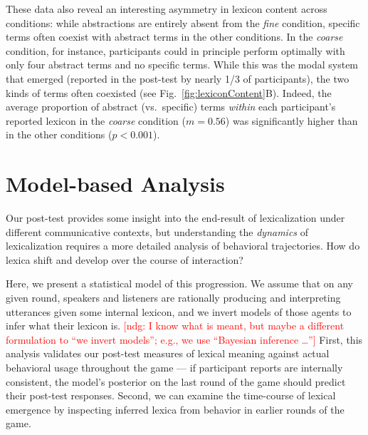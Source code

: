 \documentclass[10pt,letterpaper]{article}
\newcommand{\ndg}[1]{\textcolor{Green}{[ndg: #1]}}
\newcommand{\mf}[1]{\textcolor{Red}{[ndg: #1]}}
\begin{document}
These data also reveal an interesting asymmetry in lexicon content across conditions: while abstractions are entirely absent from the \emph{fine} condition, specific terms often coexist with abstract terms in the other conditions. In the \emph{coarse} condition, for instance, participants could in principle perform optimally with only four abstract terms and no specific terms. While this was the modal system that emerged (reported in the post-test by nearly 1/3 of participants), the two kinds of terms often coexisted (see Fig.\ \ref{fig:lexiconContent}B). Indeed, the average proportion of abstract (vs.\ specific) terms \emph{within} each participant's reported lexicon in the \emph{coarse} condition ($m = 0.56$) was significantly higher than in the other conditions ($p < 0.001$).

\section{Model-based Analysis}

Our post-test provides some insight into the end-result of lexicalization under different communicative contexts, but understanding the \emph{dynamics} of lexicalization requires a more detailed analysis of behavioral trajectories. How do lexica shift and develop over the course of interaction? 

Here, we present a statistical model of this progression. We assume that on any given round, speakers and listeners are rationally producing and interpreting utterances given some internal lexicon, and we invert models of those agents to infer what their lexicon is. \mf{I know what is meant, but maybe a different formulation to ``we invert models''; e.g., we use ``Bayesian inference \dots''} First, this analysis validates our post-test measures of lexical meaning against actual behavioral usage throughout the game --- if participant reports are internally consistent, the model's posterior on the last round of the game should predict their post-test responses. Second, we can examine the time-course of lexical emergence by inspecting inferred lexica from behavior in earlier rounds of the game. %
\end{document}
